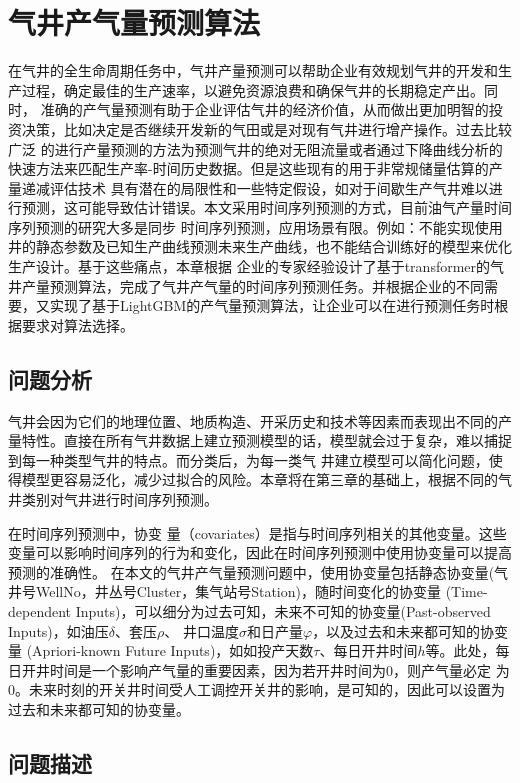 \chapter{气井产气量预测算法}
在气井的全生命周期任务中，气井产量预测可以帮助企业有效规划气井的开发和生产过程，确定最佳的生产速率，以避免资源浪费和确保气井的长期稳定产出。同时，
准确的产气量预测有助于企业评估气井的经济价值，从而做出更加明智的投资决策，比如决定是否继续开发新的气田或是对现有气井进行增产操作。过去比较广泛
的进行产量预测的方法为预测气井的绝对无阻流量或者通过下降曲线分析的快速方法来匹配生产率-时间历史数据。但是这些现有的用于非常规储量估算的产量递减评估技术
具有潜在的局限性和一些特定假设，如对于间歇生产气井难以进行预测，这可能导致估计错误。本文采用时间序列预测的方式，目前油气产量时间序列预测的研究大多是同步
时间序列预测，应用场景有限。例如：不能实现使用井的静态参数及已知生产曲线预测未来生产曲线，也不能结合训练好的模型来优化生产设计。基于这些痛点，本章根据
企业的专家经验设计了基于transformer的气井产量预测算法，完成了气井产气量的时间序列预测任务。并根据企业的不同需要，又实现了基于LightGBM的产气量预测算法，让企业可以在进行预测任务时根据要求对算法选择。
\section{问题分析}
气井会因为它们的地理位置、地质构造、开采历史和技术等因素而表现出不同的产量特性。直接在所有气井数据上建立预测模型的话，模型就会过于复杂，难以捕捉到每一种类型气井的特点。而分类后，为每一类气
井建立模型可以简化问题，使得模型更容易泛化，减少过拟合的风险。本章将在第三章的基础上，根据不同的气井类别对气井进行时间序列预测。

在时间序列预测中，协变
量（covariates）是指与时间序列相关的其他变量。这些变量可以影响时间序列的行为和变化，因此在时间序列预测中使用协变量可以提高预测的准确性。
在本文的气井产气量预测问题中，使用协变量包括静态协变量(气井号WellNo，井丛号Cluster，集气站号Station)，随时间变化的协变量
(Time-dependent Inputs)，可以细分为过去可知，未来不可知的协变量(Past-observed Inputs)，如油压\( \delta \)、套压\( \rho \)、
井口温度\( \sigma \)和日产量$\varphi $，以及过去和未来都可知的协变量
(Apriori-known Future Inputs)，如如投产天数\( \tau \)、每日开井时间$h$等。此处，每日开井时间是一个影响产气量的重要因素，因为若开井时间为0，则产气量必定
为0。未来时刻的开关井时间受人工调控开关井的影响，是可知的，因此可以设置为过去和未来都可知的协变量。
\section{问题描述}
